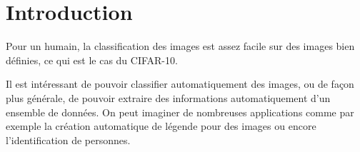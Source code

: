 \chapter{Introduction}

Pour un humain, la classification des images est assez facile sur des images bien définies, ce qui est le cas du CIFAR-10.

Il est intéressant de pouvoir classifier automatiquement des images, ou de  façon plus générale, de pouvoir extraire des informations automatiquement d'un ensemble de données. On peut imaginer de nombreuses applications comme par exemple la création automatique de légende pour des images ou encore l'identification de personnes.